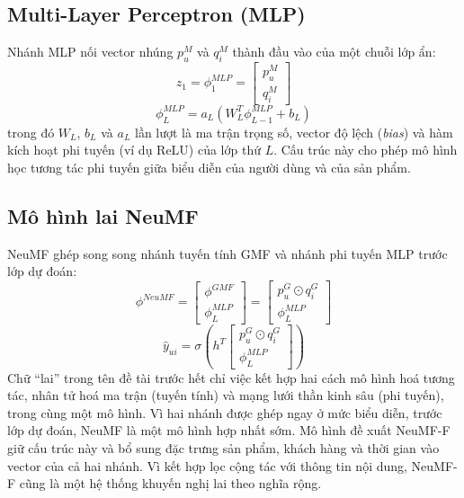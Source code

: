 \subsection{Multi-Layer Perceptron (MLP)}
\label{subsec:mlp}

Nhánh MLP nối vector nhúng $p_u^M$ và $q_i^M$ thành đầu vào của một chuỗi lớp ẩn:
\begin{equation}
    z_1 = \phi_1^{MLP} = \begin{bmatrix} p_u^M \\ q_i^M \end{bmatrix}
    \label{eq:mlp_concat}
\end{equation}
\begin{equation}
    \phi_L^{MLP} = a_L \left( W_L^T \phi_{L-1}^{MLP} + b_L \right)
    \label{eq:mlp_layerL}
\end{equation}
trong đó $W_L$, $b_L$ và $a_L$ lần lượt là ma trận trọng số, vector độ lệch (\textit{bias}) và hàm kích hoạt phi tuyến (ví dụ ReLU) của lớp thứ $L$. Cấu trúc này cho phép mô hình học tương tác phi tuyến giữa biểu diễn của người dùng và của sản phẩm.

\subsection{Mô hình lai NeuMF}
\label{subsec:neumf_arch}

NeuMF ghép song song nhánh tuyến tính GMF và nhánh phi tuyến MLP trước lớp dự đoán:
\begin{equation}
    \phi^{NeuMF} = \begin{bmatrix} \phi^{GMF} \\ \phi_L^{MLP} \end{bmatrix} = \begin{bmatrix} p_u^G \odot q_i^G \\ \phi_L^{MLP} \end{bmatrix}
    \label{eq:neumf_concat}
\end{equation}
\begin{equation}
    \hat{y}_{ui} = \sigma \left( h^T \begin{bmatrix} p_u^G \odot q_i^G \\ \phi_L^{MLP} \end{bmatrix} \right)
    \label{eq:neumf_prediction}
\end{equation}
Chữ ``lai'' trong tên đề tài trước hết chỉ việc kết hợp hai cách mô hình hoá tương tác, nhân tử hoá ma trận (tuyến tính) và mạng lưới thần kinh sâu (phi tuyến), trong cùng một mô hình. Vì hai nhánh được ghép ngay ở mức biểu diễn, trước lớp dự đoán, NeuMF là một mô hình hợp nhất sớm. Mô hình đề xuất NeuMF-F giữ cấu trúc này và bổ sung đặc trưng sản phẩm, khách hàng và thời gian vào vector của cả hai nhánh. Vì kết hợp lọc cộng tác với thông tin nội dung, NeuMF-F cũng là một hệ thống khuyến nghị lai theo nghĩa rộng.

